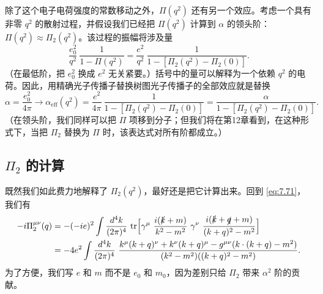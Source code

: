 除了这个电子电荷强度的常数移动之外，$\Pi(q^2)$ 还有另一个效应。考虑一个具有非零 $q^2$ 的散射过程，并假设我们已经把 $\Pi(q^2)$ 计算到 $\alpha$ 的领头阶：$\Pi(q^2) \approx \Pi_2(q^2)$。该过程的振幅将涉及量
\begin{equation}
  \frac{e_0^2}{q^2}\ \frac{1}{1-\Pi(q^2)} = \frac{e^2}{q^2}\
    \frac{1}{1 - [\Pi_2(q^2) - \Pi_2(0)]} .
\end{equation}
（在最低阶，把 $e_0^2$ 换成 $e^2$ 无关紧要。）括号中的量可以解释为一个依赖 $q^2$ 的电荷。因此，用精确光子传播子替换树图光子传播子的全部效应就是替换
\begin{equation}
  \alpha = \frac{e_0^2}{4\pi}
    \to \alpha_{\mathrm{eff}}(q^2) = \frac{e^2}{4\pi}\
      \frac{1}{1 - [\Pi_2(q^2)-\Pi_2(0)]}
    = \frac{\alpha}{1 - [\Pi_2(q^2)-\Pi_2(0)]} .
  \label{eq:7.77}
\end{equation}
（在领头阶，我们同样可以把 $\Pi$ 项移到分子；但我们将在第12章看到，在这种形式下，当把 $\Pi_2$ 替换为 $\Pi$ 时，该表达式对所有阶都成立。）

\subsection{$\Pi_2$ 的计算}

既然我们如此费力地解释了 $\Pi_2(q^2)$，最好还是把它计算出来。回到 \eqref{eq:7.71}，我们有
\begin{equation}
  \begin{aligned}
    -i\Pi^{\mu\nu}_2(q) &= -(-ie)^2 \int \frac{d^4k}{(2\pi)^4}\
      \mathrm{tr}\Bigl[ \gamma^\mu\ \frac{i(\slashed{k}+m)}{k^2-m^2}\
        \gamma^\nu\ \frac{i(\slashed{k}+\slashed{q}+m)}
          {(k+q)^2-m^2} \Bigr]\\
    &= -4e^2 \int \frac{d^4k}{(2\pi)^4}\
      \frac{k^\mu(k+q)^\nu + k^\nu(k+q)^\mu - g^{\mu\nu}
        (k\cdot(k+q) - m^2)}
        {(k^2-m^2)((k+q)^2-m^2)} .
  \end{aligned}
  \label{eq:7.78}
\end{equation}
为了方便，我们写 $e$ 和 $m$ 而不是 $e_0$ 和 $m_0$，因为差别只给 $\Pi_2$ 带来 $\alpha^2$ 阶的贡献。

